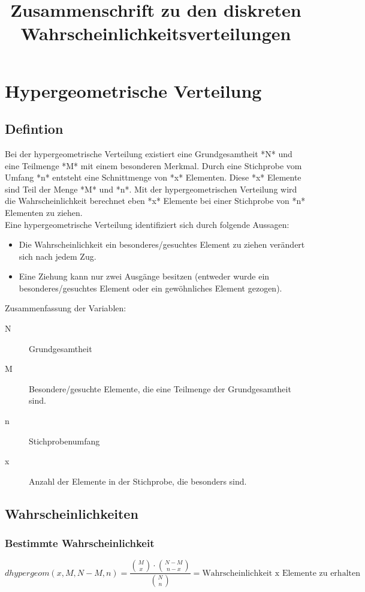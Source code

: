 \documentclass[a4paper,10pt]{article}
\title{Zusammenschrift zu den diskreten Wahrscheinlichkeitsverteilungen}
\begin{document}
\maketitle
\thispagestyle{fancy}

\section{Hypergeometrische Verteilung}
\subsection{Defintion}
Bei der hypergeometrische Verteilung existiert eine Grundgesamtheit
*N* und eine Teilmenge *M* mit einem besonderen Merkmal. Durch eine
Stichprobe vom Umfang *n* entsteht eine Schnittmenge von *x*
Elementen. Diese *x* Elemente sind Teil der Menge *M* und *n*. Mit der
hypergeometrischen Verteilung wird die Wahrscheinlichkeit berechnet
eben *x* Elemente bei einer Stichprobe von *n* Elementen zu ziehen.
\\
Eine hypergeometrische Verteilung identifiziert sich durch folgende
Aussagen:
\begin{itemize}
\item Die Wahrscheinlichkeit ein besonderes/gesuchtes Element zu
  ziehen verändert sich nach jedem Zug.
\item Eine Ziehung kann nur zwei Ausgänge besitzen (entweder wurde ein
  besonderes/gesuchtes Element oder ein gewöhnliches Element gezogen).
\end{itemize}

Zusammenfassung der Variablen:
\begin{description}
\item[N] Grundgesamtheit
\item[M] Besondere/gesuchte Elemente, die eine Teilmenge der
  Grundgesamtheit sind.
\item[n] Stichprobenumfang
\item[x] Anzahl der Elemente in der Stichprobe, die besonders sind.
\end{description}

\subsection{Wahrscheinlichkeiten}
\subsubsection{Bestimmte Wahrscheinlichkeit}
\begin{equation}
  \label{eq:1}
  dhypergeom(x, M, N - M, n) = \frac{\binom{M}{x} \cdot \binom{N - M}{n - x}}{\binom{N}{n}} = \text{Wahrscheinlichkeit x Elemente zu erhalten}
\end{equation}
\end{document}
